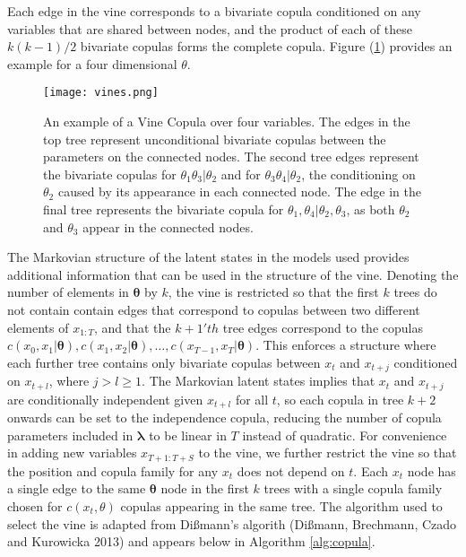 \documentclass[12pt,a4paper]{article}%
\numberwithin{equation}{section}
\begin{document}
Each edge in the vine corresponds to a bivariate copula conditioned on any variables that are shared between nodes, and the product of each of these $k(k-1)/2$ bivariate copulas forms the complete copula. Figure (\ref{fig:vinecop}) provides an example for a four dimensional $\theta$.
\begin{figure}[h]
\centering
\texttt{[image: vines.png]}
\vspace{2mm}
\caption{An example of a Vine Copula over four variables. The edges in the top tree represent unconditional bivariate copulas between the parameters on the connected nodes. The second tree edges represent the bivariate copulas for $\theta_1 \theta_3 | \theta_2$ and for $\theta_3 \theta_4 | \theta_2$, the conditioning on $\theta_2$ caused by its appearance in each connected node. The edge in the final tree represents the bivariate copula for $\theta_1, \theta_4 | \theta_2, \theta_3$, as both $\theta_2$ and $\theta_3$ appear in the connected nodes.}
\label{fig:vinecop}
\end{figure}

The Markovian structure of the latent states in the models used provides additional information that can be used in the structure of the vine. Denoting the number of elements in $\boldsymbol{\theta}$ by $k$, the vine is restricted so that the first $k$ trees do not contain contain edges that correspond to copulas between two different elements of $x_{1:T}$, and that the $k+1'th$ tree edges correspond to the copulas $c(x_0, x_1 | \boldsymbol{\theta}), c(x_1, x_2 | \boldsymbol{\theta}), \dots, c(x_{T-1}, x_T | \boldsymbol{\theta})$. This enforces a structure where each further tree contains only bivariate copulas between $x_t$ and $x_{t+j}$ conditioned on $x_{t+l}$, where $j > l \geq 1$. The Markovian latent states implies that $x_t$ and $x_{t+j}$ are conditionally independent given $x_{t+l}$ for all $t$, so each copula in tree $k+2$ onwards can be set to the independence copula, reducing the number of copula parameters included in $\boldsymbol{\lambda}$ to be linear in $T$ instead of quadratic. For convenience in adding new variables $x_{T+1:T+S}$ to the vine, we further restrict the vine so that the position and copula family for any $x_t$ does not depend on $t$. Each $x_t$ node has a single edge to the same $\boldsymbol{\theta}$ node in the first $k$ trees with a single copula family chosen for $c(x_t, \theta)$ copulas appearing in the same tree. The algorithm used to select the vine is adapted from Di{\ss}mann's algorith (Di{\ss}mann, Brechmann, Czado and Kurowicka 2013) and appears below in Algorithm \ref{alg:copula}.
\end{document}

